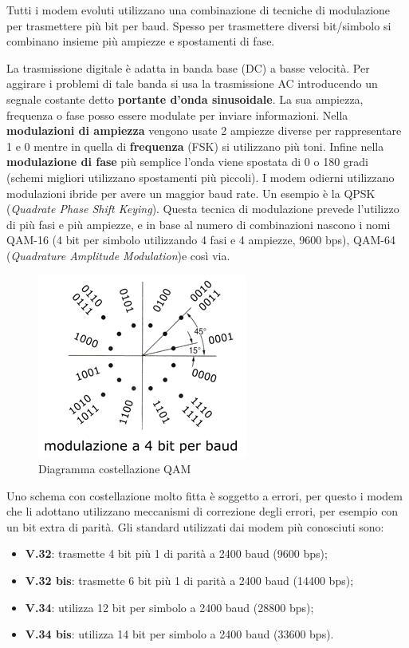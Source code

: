 Tutti i modem evoluti utilizzano una combinazione di tecniche di modulazione per trasmettere più bit per baud. Spesso per trasmettere diversi bit/simbolo si combinano insieme più ampiezze e spostamenti di fase.

La trasmissione digitale è adatta in banda base (DC) a basse velocità. Per aggirare i problemi di tale banda si usa la trasmissione AC introducendo un segnale costante detto \textbf{portante d'onda sinusoidale}. La sua ampiezza, frequenza o fase posso essere modulate per inviare informazioni. Nella \textbf{modulazioni di ampiezza} vengono usate 2 ampiezze diverse per rappresentare 1 e 0 mentre in quella di \textbf{frequenza} (FSK) si utilizzano più toni. Infine nella \textbf{modulazione di fase} più semplice l'onda viene spostata di 0 o 180 gradi (schemi migliori utilizzano spostamenti più piccoli). I modem odierni utilizzano modulazioni ibride per avere un maggior baud rate. Un esempio è la QPSK (\textit{Quadrate Phase Shift Keying}). Questa tecnica di modulazione prevede l'utilizzo di più fasi e più ampiezze, e in base al numero di combinazioni nascono i nomi QAM-16 (4 bit per simbolo utilizzando 4 fasi e 4 ampiezze, 9600 bps), QAM-64 (\textit{Quadrature Amplitude Modulation})e così via.

\begin{figure}[htbp]
\centering
\includegraphics[scale=1]{images/qam.png}
\caption{Diagramma costellazione QAM}
\end{figure}

Uno schema con costellazione molto fitta è soggetto a errori, per questo i modem che li adottano utilizzano meccanismi di correzione degli errori, per esempio con un bit extra di parità.
Gli standard utilizzati dai modem più conosciuti sono:

\begin{itemize}

\item{\textbf{V.32}: trasmette 4 bit più 1 di parità a 2400 baud (9600 bps)};
\item{\textbf{V.32 bis}: trasmette 6 bit più 1 di parità a 2400 baud (14400 bps)};
\item{\textbf{V.34}: utilizza 12 bit per simbolo a 2400 baud (28800 bps)};
\item{\textbf{V.34 bis}: utilizza 14 bit per simbolo a 2400 baud (33600 bps)}.

\end{itemize}


